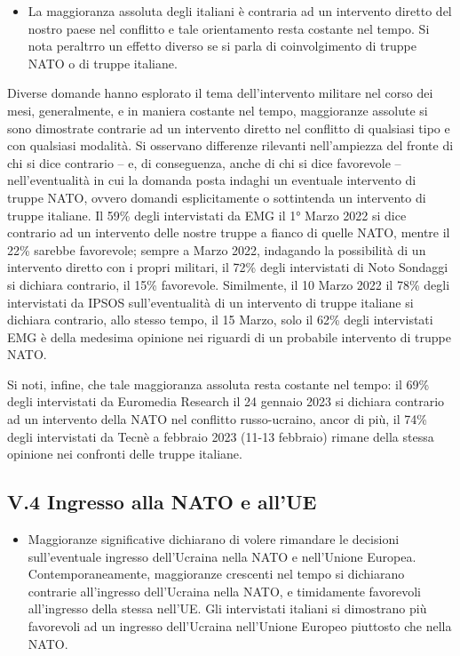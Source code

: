 \documentclass[
  openany]{book}
\providecommand{\tightlist}{%
  \setlength{\itemsep}{0pt}\setlength{\parskip}{0pt}}
\begin{document}
\begin{itemize}
\tightlist
\item
  La maggioranza assoluta degli italiani è contraria ad un intervento diretto del nostro paese nel conflitto e tale orientamento resta costante nel tempo. Si nota peraltrro un effetto diverso se si parla di coinvolgimento di truppe NATO o di truppe italiane.
\end{itemize}

Diverse domande hanno esplorato il tema dell'intervento militare nel corso dei mesi, generalmente, e in maniera costante nel tempo, maggioranze assolute si sono dimostrate contrarie ad un intervento diretto nel conflitto di qualsiasi tipo e con qualsiasi modalità. Si osservano differenze rilevanti nell'ampiezza del fronte di chi si dice contrario -- e, di conseguenza, anche di chi si dice favorevole -- nell'eventualità in cui la domanda posta indaghi un eventuale intervento di truppe NATO, ovvero domandi esplicitamente o sottintenda un intervento di truppe italiane. Il 59\% degli intervistati da EMG il 1° Marzo 2022 si dice contrario ad un intervento delle nostre truppe a fianco di quelle NATO, mentre il 22\% sarebbe favorevole; sempre a Marzo 2022, indagando la possibilità di un intervento diretto con i propri militari, il 72\% degli intervistati di Noto Sondaggi si dichiara contrario, il 15\% favorevole. Similmente, il 10 Marzo 2022 il 78\% degli intervistati da IPSOS sull'eventualità di un intervento di truppe italiane si dichiara contrario, allo stesso tempo, il 15 Marzo, solo il 62\% degli intervistati EMG è della medesima opinione nei riguardi di un probabile intervento di truppe NATO.

Si noti, infine, che tale maggioranza assoluta resta costante nel tempo: il 69\% degli intervistati da Euromedia Research il 24 gennaio 2023 si dichiara contrario ad un intervento della NATO nel conflitto russo-ucraino, ancor di più, il 74\% degli intervistati da Tecnè a febbraio 2023 (11-13 febbraio) rimane della stessa opinione nei confronti delle truppe italiane.

\hypertarget{v.4-ingresso-alla-nato-e-allue}{%
\subsection{V.4 Ingresso alla NATO e all'UE}\label{v.4-ingresso-alla-nato-e-allue}}

\begin{itemize}
\tightlist
\item
  Maggioranze significative dichiarano di volere rimandare le decisioni sull'eventuale ingresso dell'Ucraina nella NATO e nell'Unione Europea. Contemporaneamente, maggioranze crescenti nel tempo si dichiarano contrarie all'ingresso dell'Ucraina nella NATO, e timidamente favorevoli all'ingresso della stessa nell'UE. Gli intervistati italiani si dimostrano più favorevoli ad un ingresso dell'Ucraina nell'Unione Europeo piuttosto che nella NATO.
\end{itemize}
\end{document}
